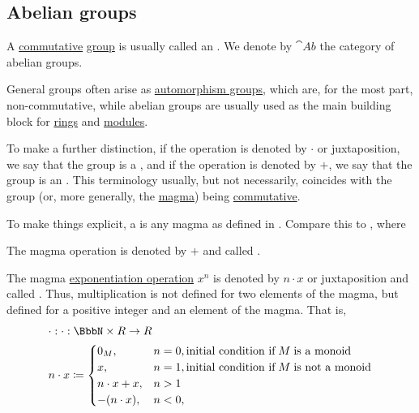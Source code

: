 \subsection{Abelian groups}\label{subsec:abelian_groups}

\begin{definition}\label{def:abelian_group}
  A \hyperref[def:magma/commutative]{commutative} \hyperref[def:group]{group} is usually called an . We denote by \( \cat{Ab} \) the category of abelian groups.
\end{definition}

\begin{remark}\label{rem:additive_magma}
  General groups often arise as \hyperref[def:automorphism_group]{automorphism groups}, which are, for the most part, non-commutative, while abelian groups are usually used as the main building block for \hyperref[def:ring]{rings} and \hyperref[def:module]{modules}.

  To make a further distinction, if the operation is denoted by \( \cdot \) or juxtaposition, we say that the group is a , and if the operation is denoted by \( + \), we say that the group is an . This terminology usually, but not necessarily, coincides with the group (or, more generally, the \hyperref[def:magma]{magma}) being \hyperref[def:magma/commutative]{commutative}.

  To make things explicit, a  is any magma as defined in . Compare this to , where
  \begin{thmenum}
     The magma operation is denoted by \( + \) and called .

     The magma \hyperref[def:magma/exponentiation]{exponentiation operation} \( x^n \) is denoted by \( n \cdot x \) or juxtaposition and called . Thus, multiplication is not defined for two elements of the magma, but defined for a positive integer and an element of the magma. That is,
    \begin{equation}\label{eq:rem:additive_magma/multiplication}
      \begin{aligned}
        &\cdot: \cdot: \BbbN \times R \to R \\
        &n \cdot x \coloneqq \begin{cases}
          0_M,           &n = 0, \T{initial condition if} M \T{is a monoid} \\
          x,             &n = 1, \T{initial condition if} M \T{is not a monoid} \\
          n \cdot x + x, &n > 1 \\
          -(n \cdot x),  &n < 0, \\
        \end{cases}
      \end{aligned}
    \end{equation}


\end{thmenum}
\end{remark}
